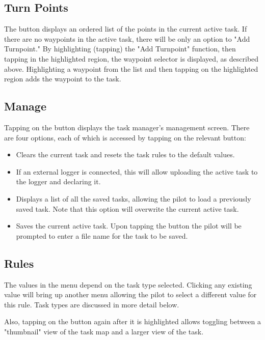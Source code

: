 \subsection*{Turn Points}
The  button displays an ordered list of the points in the 
current active task.  If there are no waypoints in the active task, there 
will be only an option to "Add Turnpoint."  By highlighting (tapping) the 
"Add Turnpoint" function, then tapping in the highlighted region, the waypoint 
selector is displayed, as described above.  Highlighting a waypoint from the 
list and then tapping on the highlighted region adds the waypoint to the task.

\subsection*{Manage}
Tapping on the  button displays the task manager's management 
screen.  There are four options, each of which is accessed by tapping on the 
relevant button:

\begin{itemize}
\item {} Clears the current task and resets the task rules to 
  the default values.
\item {}  If an external logger is connected, this will allow 
  uploading the  active task to the logger and declaring it.
\item {} Displays a list of all the saved tasks, allowing the 
  pilot to load a previously saved task.  Note that this option will overwrite 
  the current active task.
\item {}  Saves the current active task.  Upon tapping the 
   button the pilot will be prompted to enter a file name for the 
  task to be saved.
\end{itemize}

\subsection*{Rules}
The values in the  menu depend on the task type selected.  Clicking 
any existing value will bring up another menu allowing the pilot to select a 
different value for this rule.  Task types are discussed in more detail below.

Also, tapping on the  button again after it is highlighted allows 
toggling between a "thumbnail" view of the task map and a larger view of the task.

